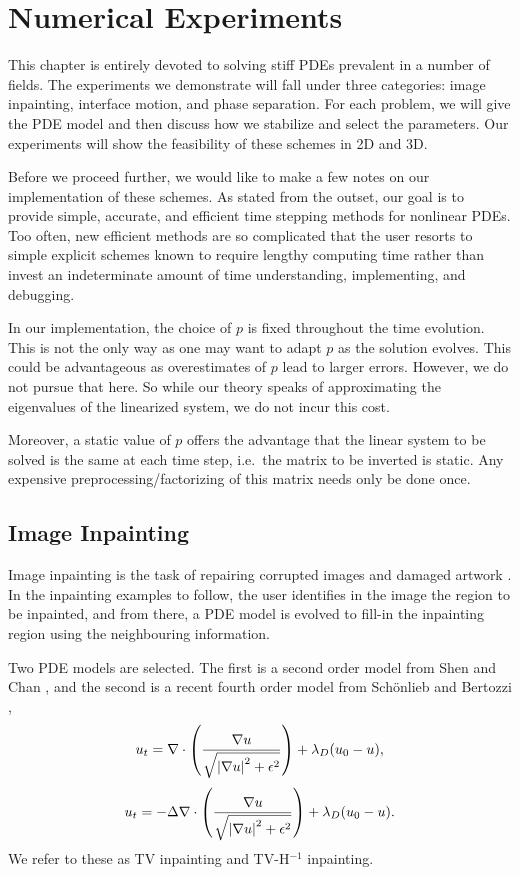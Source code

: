 \chapter{Numerical Experiments}
\label{chap:num experiments}
This chapter is entirely devoted to solving stiff PDEs prevalent in a number of fields. The experiments we demonstrate will fall under three categories: image inpainting, interface motion, and phase separation. For each problem, we will give the PDE model and then discuss how we stabilize and select the parameters. Our experiments will show the feasibility of these schemes in 2D and 3D. 

Before we proceed further, we would like to make a few notes on our implementation of these schemes. As stated from the outset, our goal is to provide simple, accurate, and efficient time stepping methods for nonlinear PDEs. Too often, new efficient methods are so complicated that the user resorts to simple explicit schemes known to require lengthy computing time rather than invest an indeterminate amount of time understanding, implementing, and debugging.

In our implementation, the choice of $p$ is fixed throughout the time evolution. This is not the only way as one may want to adapt $p$ as the solution evolves. This could be advantageous as overestimates of $p$ lead to larger errors. However, we do not pursue that here. So while our theory speaks of approximating the eigenvalues of the linearized system, we do not incur this cost. 

Moreover, a static value of $p$ offers the advantage that the linear system to be solved is the same at each time step, i.e.\ the matrix to be inverted is static. Any expensive preprocessing/factorizing of this matrix needs only be done once.

\section{Image Inpainting}
Image inpainting is the task of repairing corrupted images and damaged artwork \cite{bertalmio2000image}. In the inpainting examples to follow, the user identifies in the image the region to be inpainted, and from there, a PDE model is evolved to fill-in the inpainting region using the neighbouring information.

Two PDE models are selected. The first is a second order model from Shen and Chan \cite{shen2002mathematical}, and the second is a recent fourth order model from Sch{\"o}nlieb and Bertozzi \cite{schonlieb2011unconditionally},
\begin{align}
        u_t  = \nabla \cdot \left(\frac{\nabla u}{\sqrt{\left|\nabla u\right|^2 + \epsilon^2}} \right) 
+ \lambda_D(u_0 - u), 
\label{bv inpaint}
\end{align}
\begin{align}
         u_t  = -\Delta \nabla \cdot \left(\frac{\nabla u}{\sqrt{\left|\nabla u\right|^2 + \epsilon^2}} \right) 
+ \lambda_D(u_0 - u).
\label{tvhneg inpaint}
\end{align}
We refer to these as TV inpainting and TV-H$^{-1}$ inpainting.

